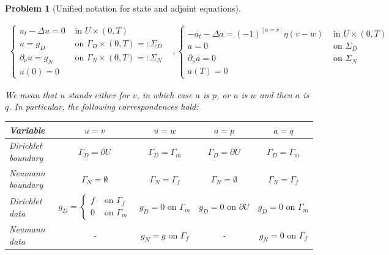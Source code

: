 \documentclass[english,a4paper,9pt,oneside]{scrbook}	%
\theoremstyle{break}
\newtheorem{pb}[equation]{Problem}
\theoremstyle{remark}
\begin{document}
\begin{pb}[Unified notation for state and adjoint equations]
\label{pb:uni_state_adj}

\[
\begin{matrix}
\left\{\begin{matrix}
u_t-\Delta u =0 & \text{ in } U\times (0,T)\\ 
u = g_D & \text{ on } \Gamma_D\times(0,T)=:\Sigma_D\\ 
\partial_\nu u = g_N & \text{ on } \Gamma_N\times(0,T)=:\Sigma_N\\ 
u(0) =0 & 
\end{matrix}\right.

&,

\left\{\begin{matrix}
-a_t-\Delta a =(-1)^{\left [a=v\right ]}\eta (v-w) & \text{ in } U\times (0,T)\\ 
a = 0 & \text{ on } \Sigma_D\\ 
\partial_\nu a = 0 & \text{ on } \Sigma_N\\ 
a(T) =0 & 
\end{matrix}\right.
\end{matrix}
\]

We mean that $u$ stands either for $v$, in which case $a$ is $p$, or $u$ is $w$ and then $a$ is $q$. In particular, the following correspondences hold:

\centering
\begin{tabular}{|l|c|c|c|c|} 
\hline
Variable           & $u=v$                                                                                      & $u=w$                          & $a = p$                          & $a=q$                           \\ 
\hline
Dirichlet boundary & $\Gamma_D = \partial U$                                                                    & $\Gamma_D=\Gamma_m$            & $\Gamma_D = \partial U$          & $\Gamma_D = \Gamma_m$           \\ 
\hline
Neumann boundary   & $\Gamma_N = \emptyset$                                                                     & $\Gamma_N = \Gamma_f$          & $\Gamma_N = \emptyset$           & $\Gamma_N = \Gamma_f$           \\
\hline
Dirichlet data     & $g_D=\left\{\begin{matrix}f&\text{ on }\Gamma_f\\0&\text{ on }\Gamma_m\end{matrix}\right.$ & $g_D = 0 \text{ on } \Gamma_m$ & $g_D = 0 \text{ on } \partial U$ & $g_D = 0 \text{ on } \Gamma_m$  \\ 
\hline
Neumann data       & -                              & $g_N = g \text{ on } \Gamma_f$ & -                                & $g_N = 0 \text{ on } \Gamma_f$ \\
\hline
\end{tabular}


\end{pb}
\end{document}
